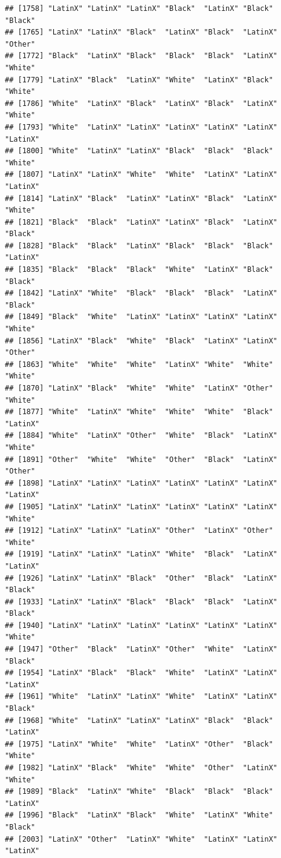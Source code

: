 \documentclass[]{book}
\begin{document}
\begin{verbatim}
## [1758] "LatinX" "LatinX" "LatinX" "Black"  "LatinX" "Black"  "Black" 
## [1765] "LatinX" "LatinX" "Black"  "LatinX" "Black"  "LatinX" "Other" 
## [1772] "Black"  "LatinX" "Black"  "Black"  "Black"  "LatinX" "White" 
## [1779] "LatinX" "Black"  "LatinX" "White"  "LatinX" "Black"  "White" 
## [1786] "White"  "LatinX" "Black"  "LatinX" "Black"  "LatinX" "White" 
## [1793] "White"  "LatinX" "LatinX" "LatinX" "LatinX" "LatinX" "LatinX"
## [1800] "White"  "LatinX" "LatinX" "Black"  "Black"  "Black"  "White" 
## [1807] "LatinX" "LatinX" "White"  "White"  "LatinX" "LatinX" "LatinX"
## [1814] "LatinX" "Black"  "LatinX" "LatinX" "Black"  "LatinX" "White" 
## [1821] "Black"  "Black"  "LatinX" "LatinX" "Black"  "LatinX" "Black" 
## [1828] "Black"  "Black"  "LatinX" "Black"  "Black"  "Black"  "LatinX"
## [1835] "Black"  "Black"  "Black"  "White"  "LatinX" "Black"  "Black" 
## [1842] "LatinX" "White"  "Black"  "Black"  "Black"  "LatinX" "Black" 
## [1849] "Black"  "White"  "LatinX" "LatinX" "LatinX" "LatinX" "White" 
## [1856] "LatinX" "Black"  "White"  "Black"  "LatinX" "LatinX" "Other" 
## [1863] "White"  "White"  "White"  "LatinX" "White"  "White"  "White" 
## [1870] "LatinX" "Black"  "White"  "White"  "LatinX" "Other"  "White" 
## [1877] "White"  "LatinX" "White"  "White"  "White"  "Black"  "LatinX"
## [1884] "White"  "LatinX" "Other"  "White"  "Black"  "LatinX" "White" 
## [1891] "Other"  "White"  "White"  "Other"  "Black"  "LatinX" "Other" 
## [1898] "LatinX" "LatinX" "LatinX" "LatinX" "LatinX" "LatinX" "LatinX"
## [1905] "LatinX" "LatinX" "LatinX" "LatinX" "LatinX" "LatinX" "White" 
## [1912] "LatinX" "LatinX" "LatinX" "Other"  "LatinX" "Other"  "White" 
## [1919] "LatinX" "LatinX" "LatinX" "White"  "Black"  "LatinX" "LatinX"
## [1926] "LatinX" "LatinX" "Black"  "Other"  "Black"  "LatinX" "Black" 
## [1933] "LatinX" "LatinX" "Black"  "Black"  "Black"  "LatinX" "Black" 
## [1940] "LatinX" "LatinX" "LatinX" "LatinX" "LatinX" "LatinX" "White" 
## [1947] "Other"  "Black"  "LatinX" "Other"  "White"  "LatinX" "Black" 
## [1954] "LatinX" "Black"  "Black"  "White"  "LatinX" "LatinX" "LatinX"
## [1961] "White"  "LatinX" "LatinX" "White"  "LatinX" "LatinX" "Black" 
## [1968] "White"  "LatinX" "LatinX" "LatinX" "Black"  "Black"  "LatinX"
## [1975] "LatinX" "White"  "White"  "LatinX" "Other"  "Black"  "White" 
## [1982] "LatinX" "Black"  "White"  "White"  "Other"  "LatinX" "White" 
## [1989] "Black"  "LatinX" "White"  "Black"  "Black"  "Black"  "LatinX"
## [1996] "Black"  "LatinX" "Black"  "White"  "LatinX" "White"  "Black" 
## [2003] "LatinX" "Other"  "LatinX" "White"  "LatinX" "LatinX" "LatinX"

\end{verbatim}
\end{document}
